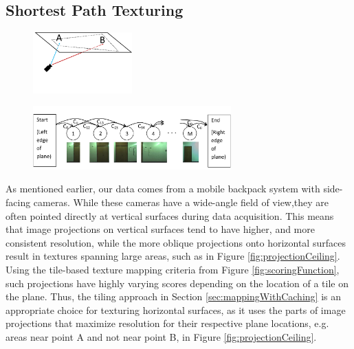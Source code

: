 \documentclass[]{spie}  %
\begin{document}
\subsection{Shortest Path Texturing}
\label{sec:shortestPath}

\begin{figure}
  \centering
  \begin{minipage}{3in}
    \centering
    \includegraphics[width=1.5in]{projectionCeiling.pdf}
    \label{fig:projectionCeiling}
  \end{minipage}%
  \hspace{0.5in}
  \begin{minipage}{3in}
    \centering
    \includegraphics[width=3in]{dagCreation.pdf}
    \label{fig:dagCreation}
  \end{minipage}
\end{figure}

As mentioned earlier, our data comes from a mobile backpack system
with side-facing cameras. While these cameras have a wide-angle field
of view,they are often pointed directly at vertical surfaces during
data acquisition. This means that image projections on vertical
surfaces tend to have higher, and more consistent resolution, while
the more oblique projections onto horizontal surfaces result in
textures spanning large areas, such as in Figure
\ref{fig:projectionCeiling}. Using the tile-based texture mapping
criteria from Figure \ref{fig:scoringFunction}, such projections have
highly varying scores depending on the location of a tile on the
plane. Thus, the tiling approach in Section
\ref{sec:mappingWithCaching} is an appropriate choice for texturing
horizontal surfaces, as it uses the parts of image projections that
maximize resolution for their respective plane locations, e.g. areas
near point A and not near point B, in Figure
\ref{fig:projectionCeiling}.
\end{document}
